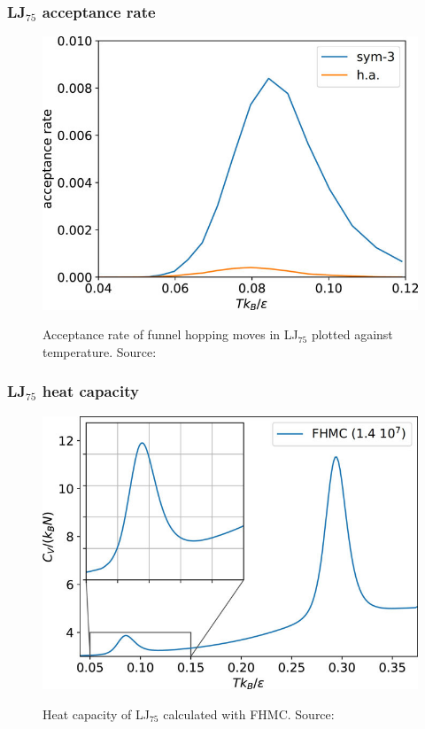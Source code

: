 \documentclass{beamer}
\begin{document}
 	\begin{frame}
 		\frametitle{LJ$_{75}$ acceptance rate} %
 		\begin{figure}
			\center
			\includegraphics[height=0.85\textheight]{figures/LJ75_acc.jpg}
			\label{fig:LJ38_acc}
			\caption{Acceptance rate of funnel hopping moves in LJ$_{75}$ plotted against temperature. Source: \cite{Finkler2020}}
		\end{figure}
 	\end{frame}

 	\begin{frame}
 		\frametitle{LJ$_{75}$ heat capacity} %
 		\begin{figure}
			\center
			\includegraphics[height=0.85\textheight]{figures/LJ75_Cv.png}
			\label{fig:LJ75_Cv}
			\caption{Heat capacity of LJ$_{75}$ calculated with FHMC. Source: \cite{Finkler2020}}
		\end{figure}
 	\end{frame}
\end{document}
